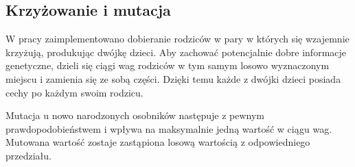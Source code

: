 \subsection{Krzyżowanie i mutacja}

W pracy zaimplementowano dobieranie rodziców w pary w których się wzajemnie krzyżują, produkując dwójkę dzieci. Aby zachować potencjalnie dobre informacje genetyczne, dzieli się ciągi wag rodziców w tym samym losowo wyznaczonym miejscu i zamienia się ze sobą części. Dzięki temu każde z dwójki dzieci posiada cechy po każdym swoim rodzicu.

Mutacja u nowo narodzonych osobników następuje z pewnym prawdopodobieństwem i wpływa na maksymalnie jedną wartość w ciągu wag. Mutowana wartość zostaje zastąpiona losową wartością z odpowiedniego przedziału.


